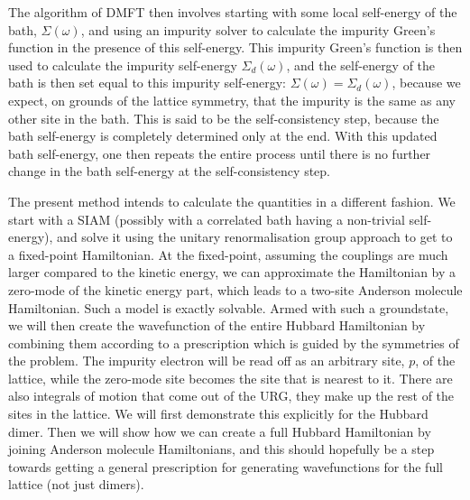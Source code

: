 \documentclass{article}
\numberwithin{equation}{section}
\begin{document}
The algorithm of DMFT then involves starting with some local self-energy of the bath, \(\Sigma(\omega)\), and using an impurity solver to calculate the impurity Green's function in the presence of this self-energy. This impurity Green's function is then used to calculate the impurity self-energy \(\Sigma_d(\omega)\), and the self-energy of the bath is then set equal to this impurity self-energy: \(\Sigma(\omega) = \Sigma_d(\omega)\), because we expect, on grounds of the lattice symmetry, that the impurity is the same as any other site in the bath. This is said to be the self-consistency step, because the bath self-energy is completely determined only at the end. With this updated bath self-energy, one then repeats the entire process until there is no further change in the bath self-energy at the self-consistency step.


The present method intends to calculate the quantities in a different fashion. We start with a SIAM (possibly with a correlated bath having a non-trivial self-energy), and solve it using the unitary renormalisation group approach to get to a fixed-point Hamiltonian. At the fixed-point, assuming the couplings are much larger compared to the kinetic energy, we can approximate the Hamiltonian by a zero-mode of the kinetic energy part, which leads to a two-site Anderson molecule Hamiltonian. Such a model is exactly solvable. Armed with such a groundstate, we will then create the wavefunction of the entire Hubbard Hamiltonian by combining them according to a prescription which is guided by the symmetries of the problem. The impurity electron will be read off as an arbitrary site, \(p\), of the lattice, while the zero-mode site becomes the site that is nearest to it. There are also integrals of motion that come out of the URG, they make up the rest of the sites in the lattice. We will first demonstrate this explicitly for the Hubbard dimer. Then we will show how we can create a full Hubbard Hamiltonian by joining Anderson molecule Hamiltonians, and this should hopefully be a step towards getting a general prescription for generating wavefunctions for the full lattice (not just dimers).
\end{document}
